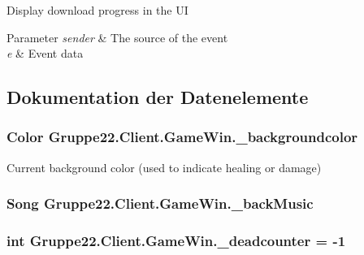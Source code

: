 Display download progress in the U\-I 


\begin{DoxyParams}{Parameter}
{\em sender} & The source of the event\\
\hline
{\em e} & Event data\\
\hline
\end{DoxyParams}


\subsection{Dokumentation der Datenelemente}
\hypertarget{class_gruppe22_1_1_client_1_1_game_win_a1d439f242a800c7bf3dcf287bc2672d2}{
\subsubsection[{\-\_\-backgroundcolor}]{\setlength{\rightskip}{0pt plus 5cm}Color Gruppe22.\-Client.\-Game\-Win.\-\_\-backgroundcolor\hspace{0.3cm}{\ttfamily [protected]}}}\label{class_gruppe22_1_1_client_1_1_game_win_a1d439f242a800c7bf3dcf287bc2672d2}


Current background color (used to indicate healing or damage) 

\hypertarget{class_gruppe22_1_1_client_1_1_game_win_ac55e767d1594960d931ba76935659afe}{
\subsubsection[{\-\_\-back\-Music}]{\setlength{\rightskip}{0pt plus 5cm}Song Gruppe22.\-Client.\-Game\-Win.\-\_\-back\-Music\hspace{0.3cm}{\ttfamily [protected]}}}\label{class_gruppe22_1_1_client_1_1_game_win_ac55e767d1594960d931ba76935659afe}
\hypertarget{class_gruppe22_1_1_client_1_1_game_win_a0aa22f5583a7f0e2ae97d8a33e8b9055}{
\subsubsection[{\-\_\-deadcounter}]{\setlength{\rightskip}{0pt plus 5cm}int Gruppe22.\-Client.\-Game\-Win.\-\_\-deadcounter = -\/1\hspace{0.3cm}{\ttfamily [protected]}}}\label{class_gruppe22_1_1_client_1_1_game_win_a0aa22f5583a7f0e2ae97d8a33e8b9055}


